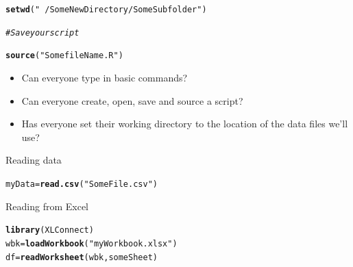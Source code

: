 \documentclass[xcolor=dvipsnames]{beamer}
\makeatletter
\newcommand{\hlstr}[1]{\textcolor[rgb]{0.192,0.494,0.8}{#1}}%
\newcommand{\hlcom}[1]{\textcolor[rgb]{0.678,0.584,0.686}{\textit{#1}}}%
\newcommand{\hlstd}[1]{\textcolor[rgb]{0.345,0.345,0.345}{#1}}%
\newcommand{\hlkwb}[1]{\textcolor[rgb]{0.69,0.353,0.396}{#1}}%
\newcommand{\hlkwd}[1]{\textcolor[rgb]{0.737,0.353,0.396}{\textbf{#1}}}%
\newenvironment{kframe}{%
 \def\at@end@of@kframe{}%
 \ifinner\ifhmode%
  \def\at@end@of@kframe{\end{minipage}}%
  \begin{minipage}{\columnwidth}%
 \fi\fi%
 \def\FrameCommand##1{\hskip\@totalleftmargin \hskip-\fboxsep
 \colorbox{shadecolor}{##1}\hskip-\fboxsep
     \hskip-\linewidth \hskip-\@totalleftmargin \hskip\columnwidth}%
 \MakeFramed {\advance\hsize-\width
   \@totalleftmargin\z@ \linewidth\hsize
   \@setminipage}}%
 {\par\unskip\endMakeFramed%
 \at@end@of@kframe}
\newenvironment{knitrout}{}{} %
\makeatother
\begin{document}
\begin{frame}[fragile]
\begin{knitrout}\tiny
{}\color{fgcolor}\begin{kframe}
\begin{alltt}
\hlkwd{setwd}\hlstd{(}\hlstr{"~/SomeNewDirectory/SomeSubfolder"}\hlstd{)}

\hlcom{# Save your script}

\hlkwd{source}\hlstd{(}\hlstr{"SomefileName.R"}\hlstd{)}
\end{alltt}
\end{kframe}
\end{knitrout}

\end{frame}

\begin{frame}
\begin{itemize}
  \item Can everyone type in basic commands?
  \item Can everyone create, open, save and source a script?
  \item Has everyone set their working directory to the location of the data files we'll use?
\end{itemize}
\end{frame}

\begin{frame}[fragile]{Reading data}
\begin{knitrout}
\color{fgcolor}\begin{kframe}
\begin{alltt}
\hlstd{myData} \hlkwb{=} \hlkwd{read.csv}\hlstd{(}\hlstr{"SomeFile.csv"}\hlstd{)}
\end{alltt}
\end{kframe}
\end{knitrout}

\end{frame}

\begin{frame}[fragile]{Reading from Excel}
\begin{knitrout}
\color{fgcolor}\begin{kframe}
\begin{alltt}
\hlkwd{library}\hlstd{(XLConnect)}
\hlstd{wbk} \hlkwb{=} \hlkwd{loadWorkbook}\hlstd{(}\hlstr{"myWorkbook.xlsx"}\hlstd{)}
\hlstd{df} \hlkwb{=} \hlkwd{readWorksheet}\hlstd{(wbk, someSheet)}
\end{alltt}
\end{kframe}
\end{knitrout}

\end{frame}
\end{document}
